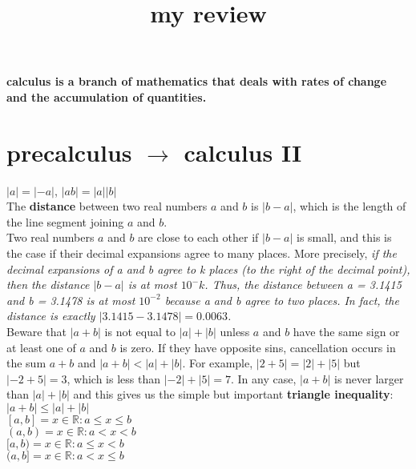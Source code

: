 \documentclass{article}
\begin{document}
\title{my review}
\maketitle

\textbf{calculus is a branch of mathematics that deals with rates of change and the accumulation of quantities.}

\section*{precalculus $\rightarrow$ calculus II}

$\lvert a\rvert = \lvert -a\rvert$, $\lvert ab\rvert = \lvert a\rvert\lvert b\rvert$\\

The \textbf{distance} between two real numbers $a$ and $b$ is $\lvert b - a \rvert$, which is the length of the line segment joining $a$ and $b$.\\
Two real numbers $a$ and $b$ are close to each other if $\lvert b - a\rvert$ is small, and this is the case if their decimal expansions agree to many places. More precisely, \textit{if the decimal expansions of a and b agree to k places (to the right of the decimal point), then the distance $\lvert b - a\rvert$ is at most $10^-k$. Thus, the distance between a = 3.1415 and b = 3.1478 is at most $10^{-2}$ because a and b agree to two places. In fact, the distance is exactly $\lvert3.1415 - 3.1478\rvert = 0.0063$.}\\

Beware that $\lvert a + b\rvert$ is not equal to $\lvert a\rvert + \lvert b\rvert$ unless $a$ and $b$ have the same sign or at least one of $a$ and $b$ is zero. If they have opposite sins, cancellation occurs in the sum $a + b$ and $\lvert a+b\rvert < \lvert a\rvert + \lvert b\rvert$. For example, $\lvert 2 + 5\rvert = \lvert2\rvert + \lvert5\rvert$ but $\lvert-2 + 5\rvert = 3$, which is less than $\lvert-2\rvert + \lvert5\rvert = 7$. In any case, $\lvert a + b\rvert$ is never larger than $\lvert a\rvert + \lvert b\rvert$ and this gives us the simple but important \textbf{triangle inequality}: $\lvert a + b\rvert \leq \lvert a\rvert + \lvert b\rvert$\\

$[a, b] = {x \in \mathbb{R} : a \leq x \leq b}$\\
$(a, b) = {x \in \mathbb{R} : a < x < b}$\\
$[a, b) = {x \in \mathbb{R} : a \leq x < b}$\\
$(a, b] = {x \in \mathbb{R} : a < x \leq b}$\\
\end{document}
